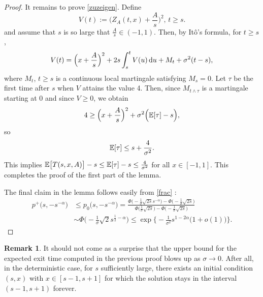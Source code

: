 \documentclass[sn-mathphys-num]{sn-jnl}
\theoremstyle{definition}
\newtheorem{rem}[thm]{Remark}
\newcommand{\scr}[1]{\mathscr #1}
\numberwithin{equation}{section} \theoremstyle{remark}
\renewcommand{\d}{\hbox{d}}
\def\d{\text{\rm{d}}} \def\bb{\beta} \def\aa{\alpha} \def\D{\scr D}
\def\P{\mathbb P}
\newcommand{\1}{\mathbbm{1}}
\begin{document}
\begin{proof}

It remains to prove \eqref{zuzeigen}. Define
$$
V(t):=\Big(Z_A(t,x)+\frac As\Big)^2,\,t \geq s.
$$
and assume that $s$ is so large that $\frac As \in (-1,1)$. Then, by It\^o's formula, for $t \geq s$,
$$
V(t)=\Big(x+\frac As\Big)^2+2s\int_s^t V(u)\,\d u+M_t+\sigma^2 (t-s),
$$
where $M_t$, $t \geq s$ is a continuous local martingale satisfying $M_s=0$. Let $\tau$ be the first time after $s$ when $V$ attains the value 4. Then, since $M_{t\wedge \tau}$ is a martingale starting at 0 and since $V \geq 0$, we obtain
$$
4 \geq \Big(x+\frac As\Big)^2 + \sigma^2 \Big(\mathbb E [\tau]-s\Big),
$$
so
$$
\mathbb E [\tau] \leq s+ \frac 4{\sigma^2}.  
$$
This implies $\mathbb E \big[T(s,x,A)\big]-s \leq \mathbb E [\tau]-s \leq \frac 4{\sigma^2}$ for all $x \in [-1,1]$. %
This completes the proof of the first part of the lemma.

The final claim in the lemma   follows easily from \eqref{frac} :
\begin{align*}
p^+\big(s,-s^{-\alpha}\big)&\leq p_0(s,-s^{-\alpha}\big)=\frac{\Phi\Big(-\frac1\sigma \sqrt{2s}s^{-\alpha}\Big)-\Phi\Big(-\frac1\sigma \sqrt{2s}\Big)}{\Phi\Big(\frac1\sigma \sqrt{2s}\Big)-\Phi\Big(-\frac1\sigma \sqrt{2s}\Big)}\\
&\sim  \Phi\Big(-\frac1\sigma \sqrt{2}s^{\frac 12-\alpha}\Big)  \leq\exp\Big\{-\frac 1{\sigma^2}s^{1-2\alpha}\big(1+o(1)\big)    \Big\}.
\end{align*}


\end{proof}

\begin{rem}
  It should not come as a surprise that the upper bound for the expected exit time computed in the previous proof blows up as $\sigma \to 0$. After all, in the deterministic case, for $s$ sufficiently large, there exists an initial condition $(s,x)$ with $x \in [s-1,s+1]$ for which the solution stays in the interval $(s-1,s+1)$ forever.
\end{rem}
\end{document}

